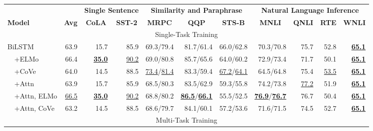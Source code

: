 \documentclass{article} \usepackage{iclr2019_conference,times}
\begin{document}
\begin{table*}[t]
\centering \fontsize{8.4}{10.1}\selectfont \setlength{\tabcolsep}{0.5em}
\begin{tabular}{lrrrrrrrrrr}

\toprule

&& \multicolumn{2}{c}{\textbf{Single Sentence}} & \multicolumn{3}{c}{\textbf{Similarity and Paraphrase}} & \multicolumn{4}{c}{\textbf{Natural Language Inference}} \\
\textbf{Model} & \multicolumn{1}{c}{\textbf{Avg}} & \multicolumn{1}{c}{\textbf{CoLA}} & \multicolumn{1}{c}{\textbf{SST-2}} & \multicolumn{1}{c}{\textbf{MRPC}} & \multicolumn{1}{c}{\textbf{QQP}} & \multicolumn{1}{c}{\textbf{STS-B}} & \multicolumn{1}{c}{\textbf{MNLI}} & \multicolumn{1}{c}{\textbf{QNLI}} & \multicolumn{1}{c}{\textbf{RTE}} & \multicolumn{1}{c}{\textbf{WNLI}} \\
\midrule
\multicolumn{11}{c}{Single-Task Training} \\
\midrule

BiLSTM & 63.9 & 15.7 & 85.9 & 69.3/79.4 & 81.7/61.4 & 66.0/62.8 & 70.3/70.8 & 75.7 & 52.8 & \textbf{\underline{65.1}} \\

~~+ELMo & 66.4 & \textbf{\underline{35.0}} & \underline{90.2} & 69.0/80.8 & 85.7/65.6 & 64.0/60.2 & 72.9/73.4 & 71.7 & 50.1 & \textbf{\underline{65.1}} \\

~~+CoVe & 64.0 & 14.5 & 88.5 & \underline{73.4}/\underline{81.4} & 83.3/59.4 & \underline{67.2}/\underline{64.1} & 64.5/64.8 & 75.4 & \underline{53.5} & \textbf{\underline{65.1}} \\

~~+Attn & 63.9 & 15.7 & 85.9 & 68.5/80.3 & 83.5/62.9 & 59.3/55.8 & 74.2/73.8 & \underline{77.2} & 51.9 & \textbf{\underline{65.1}} \\

~~+Attn, ELMo & \underline{66.5} & \textbf{\underline{35.0}} & \underline{90.2} & 68.8/80.2 & \textbf{\underline{86.5}}/\textbf{\underline{66.1}} & 55.5/52.5 & \textbf{\underline{76.9}}/\textbf{\underline{76.7}} & 76.7 & 50.4 & \textbf{\underline{65.1}} \\

~~+Attn, CoVe & 63.2 & 14.5 & 88.5 & 68.6/79.7 & 84.1/60.1 & 57.2/53.6 & 71.6/71.5 & 74.5 & 52.7 & \textbf{\underline{65.1}} \\

\midrule
\multicolumn{11}{c}{Multi-Task Training} \\
\midrule


\end{tabular}
\end{table*}
\end{document}
